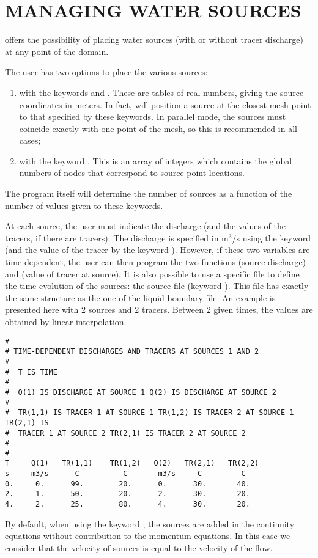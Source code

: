 \chapter{MANAGING WATER SOURCES}
\label{ch:manag:ws}
 offers the possibility of placing water sources (with or without
tracer discharge) at any point of the domain.

The user has two options to place the various sources:
\begin{enumerate}
\item with the keywords  and
.
These are tables of real numbers,
giving the source coordinates in meters. In fact,  will position a
source at the closest mesh point to that specified by these keywords.
In parallel mode, the sources must coincide exactly with one point of the mesh,
so this is recommended in all cases;
\item with the keyword . This is an
array of integers which contains the global numbers of nodes that correspond
 to source point locations.
\end{enumerate}
The program itself will determine the number of sources as a function of the
number of values given to these keywords.

At each source, the user must indicate the discharge (and the values of the
tracers, if there are tracers). The discharge is specified in m${}^{3}$/s using
the keyword  (and the value of the tracer by
the keyword ). However, if these
two variables are time-dependent, the user can then program the two functions
 (source discharge) and  (value of tracer at
source). It is also possible to use a specific file to define the time
evolution of the sources:
the source file (keyword ). This file has exactly the same
structure as the one of the liquid boundary file. An example is presented here
with 2 sources and 2 tracers. Between 2 given times, the values are obtained by
linear interpolation.
\begin{lstlisting}[language=TelemacCas]
#
# TIME-DEPENDENT DISCHARGES AND TRACERS AT SOURCES 1 AND 2
#
#  T IS TIME
#
#  Q(1) IS DISCHARGE AT SOURCE 1 Q(2) IS DISCHARGE AT SOURCE 2
#
#  TR(1,1) IS TRACER 1 AT SOURCE 1 TR(1,2) IS TRACER 2 AT SOURCE 1 TR(2,1) IS
#  TRACER 1 AT SOURCE 2 TR(2,1) IS TRACER 2 AT SOURCE 2
#
#
T     Q(1)   TR(1,1)    TR(1,2)   Q(2)   TR(2,1)   TR(2,2)
s     m3/s      C          C       m3/s     C         C
0.     0.      99.        20.      0.      30.       40.
2.     1.      50.        20.      2.      30.       20.
4.     2.      25.        80.      4.      30.       20.
\end{lstlisting}
By default, when using the keyword , the
sources are added in the continuity equations without contribution to the
momentum equations. In this case we consider that the velocity of sources is
equal to the velocity of the flow.

